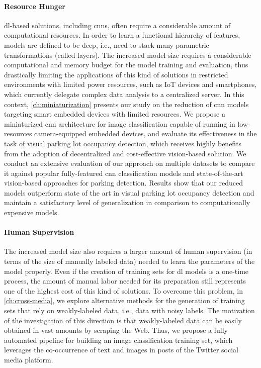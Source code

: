 \paragraph{Resource Hunger}
\Gls{dl}-based solutions, including \glspl{cnn}, often require a considerable amount of computational resources.
In order to learn a functional hierarchy of features, models are defined to be deep, i.e., need to stack many parametric transformations (called layers).
The increased model size requires a considerable computational and memory budget for the model training and evaluation, thus drastically limiting the applications of this kind of solutions in restricted environments with limited power resources, such as IoT devices and smartphones, which currently delegate complex data analysis to a centralized server.
In this context, \ref{ch:miniaturization} presents our study on the reduction of \gls{cnn} models targeting smart embedded devices with limited resources.
We propose a miniaturized \gls{cnn} architecture for image classification capable of running in low-resources camera-equipped embedded devices, and evaluate its effectiveness in the task of visual parking lot occupancy detection, which receives highly benefits from the adoption of decentralized and cost-effective vision-based solution.
We conduct an extensive evaluation of our approach on multiple datasets to compare it against popular fully-featured \gls{cnn} classification models and state-of-the-art vision-based approaches for parking detection. %
Results show that our reduced models outperform state of the art in visual parking lot occupancy detection and maintain a satisfactory level of generalization in comparison to computationally expensive models.

\paragraph{Human Supervision}
The increased model size also requires a larger amount of human supervision (in terms of the size of manually labeled data) needed to learn the parameters of the model properly.
Even if the creation of training sets for \gls{dl} models is a one-time process, the amount of manual labor needed for its preparation still represents one of the highest cost of this kind of solutions.
To overcome this problem, in \ref{ch:cross-media}, we explore alternative methods for the generation of training sets that rely on weakly-labeled data, i.e., data with noisy labels.
The motivation of the investigation of this direction is that weakly-labeled data can be easily obtained in vast amounts by scraping the Web.
Thus, we propose a fully automated pipeline for building an image classification training set, which leverages the co-occurrence of text and images in posts of the Twitter social media platform.

